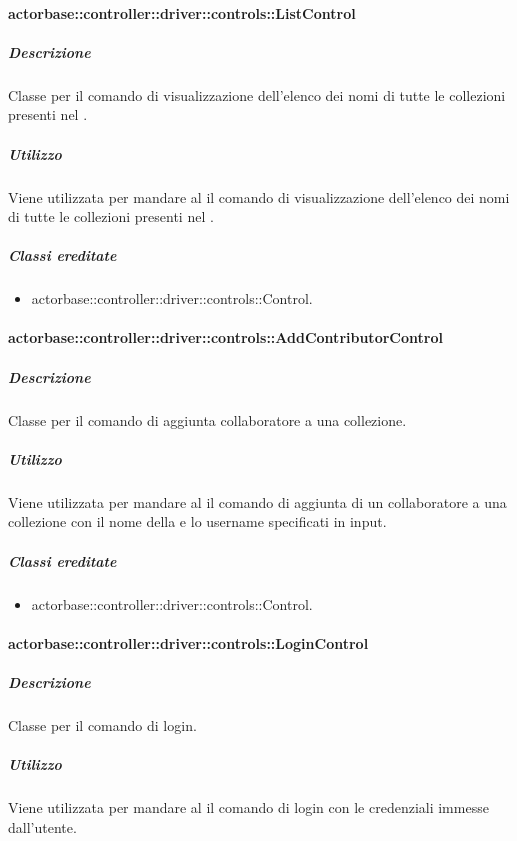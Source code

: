\documentclass{scalatekids-article}
\begin{document}
\paragraph{actorbase::controller::driver::controls::ListControl}

\subparagraph{Descrizione}

Classe per il comando di visualizzazione dell'elenco dei nomi di tutte le
collezioni presenti nel .

\subparagraph{Utilizzo}

Viene utilizzata per mandare al  il comando di visualizzazione
dell'elenco dei nomi di tutte le collezioni presenti nel .

\subparagraph{Classi ereditate}

\begin{itemize}
\item actorbase::controller::driver::controls::Control.
\end{itemize}

\paragraph{actorbase::controller::driver::controls::AddContributorControl}

\subparagraph{Descrizione}

Classe per il comando di aggiunta collaboratore a una collezione.

\subparagraph{Utilizzo}

Viene utilizzata per mandare al  il comando di aggiunta di un
collaboratore a una collezione con il nome della  e lo
username specificati in input.

\subparagraph{Classi ereditate}

\begin{itemize}
\item actorbase::controller::driver::controls::Control.
\end{itemize}

\paragraph{actorbase::controller::driver::controls::LoginControl}

\subparagraph{Descrizione}

Classe per il comando di login.

\subparagraph{Utilizzo}

Viene utilizzata per mandare al  il comando di login con le
credenziali immesse dall'utente.
\end{document}
